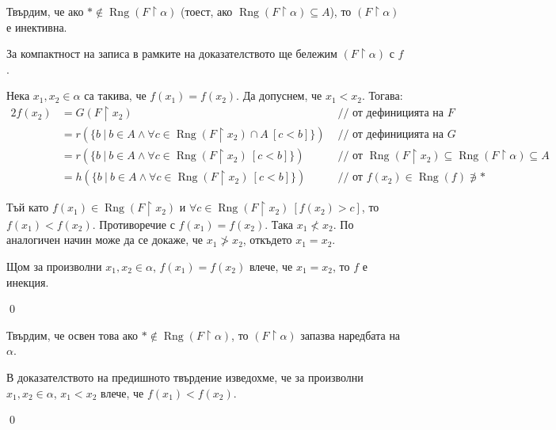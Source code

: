 \quad
Твърдим, че ако $* \notin \operatorname{Rng}(F \restriction \alpha)$
(тоест, ако $\operatorname{Rng}(F \restriction \alpha) \subseteq A$), то $(F \restriction \alpha)$ е инективна.
\begin{tcolorbox}[mybox={Доказателство:}]
\begin{remark}
За компактност на записа в рамките на доказателството ще бележим $(F \restriction \alpha)$ с $f$.
\end{remark}

\smallbreak
\quad
Нека $x_1, x_2 \in \alpha$ са такива, че $f(x_1) = f(x_2)$.
Да допуснем, че $x_1 < x_2$.
Тогава:
\begin{alignat*}{2}
f(x_2) & = G(F \restriction x_2)                                                                              & \text{ // от дефиницията на $F$ } \\
       & = r( \{b\ |\ b \in A \land \forall c \in \operatorname{Rng}(F \restriction x_2) \cap A \ [c < b] \}) & \text{ // от дефиницията на $G$ } \\
       & = r( \{b\ |\ b \in A \land \forall c \in \operatorname{Rng}(F \restriction x_2) \ [c < b] \})        & \text{ // от $\operatorname{Rng}(F \restriction x_2) \subseteq \operatorname{Rng}(F \restriction \alpha) \subseteq A$ } \\
       & = h( \{b\ |\ b \in A \land \forall c \in \operatorname{Rng}(F \restriction x_2) \ [c < b] \})        & \text{ // от $f(x_2) \in \operatorname{Rng}(f) \not\ni *$ }
\end{alignat*}

\quad
Тъй като $f(x_1) \in \operatorname{Rng}(F \restriction x_2)$ и $\forall c \in \operatorname{Rng}(F \restriction x_2)\ [f(x_2) > c]$,
то $f(x_1) < f(x_2)$. Противоречие с $f(x_1) = f(x_2)$.
Така $x_1 \not < x_2$.
По аналогичен начин може да се докаже, че $x_1 \not > x_2$, откъдето $x_1 = x_2$.

\quad
Щом за произволни $x_1, x_2 \in \alpha$, $f(x_1) = f(x_2)$ влече, че $x_1 = x_2$, то $f$ е инекция.

\qed
\end{tcolorbox}

\quad
Твърдим, че освен това ако $* \notin \operatorname{Rng}(F \restriction \alpha)$, то
$(F \restriction \alpha)$ запазва наредбата на $\alpha$.
\begin{tcolorbox}[mybox={Доказателство:}]
\quad
В доказателството на предишното твърдение изведохме, че за произволни $x_1, x_2 \in \alpha$,
$x_1 < x_2$ влече, че $f(x_1) < f(x_2)$.

\qed
\end{tcolorbox}


